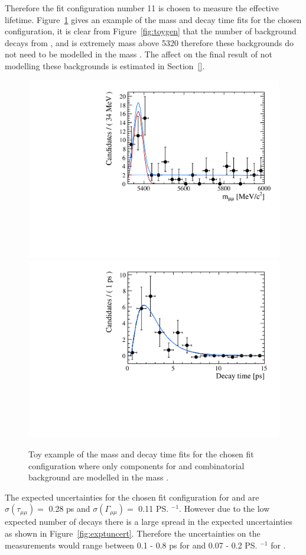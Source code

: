 {\pagebreak


Therefore the fit configuration number 11 is chosen to measure the \bsmumu effective lifetime. Figure~\ref{fig:toyegs} gives an example of the mass and decay time \ml fits for the chosen configuration, it is clear from Figure~\ref{fig:toygen} that the number of background decays from \bdmumu, \bhh and \lambdab is extremely mass above 5320 \mevcc therefore these backgrounds do not need to be modelled in the mass \pdf. The affect on the final result of not modelling these backgrounds is estimated in Section~\ref{}.

\begin{figure}[htbp]
    \centering
        \includegraphics[width= 0.49 \textwidth]{./Figs/LifetimeMeasurement/5320-6000_toy_mass.pdf}
       \includegraphics[width=0.49 \textwidth]{./Figs/LifetimeMeasurement/5320-6000_toy_lifetime.pdf}
    \caption{Toy example of the mass and decay time \ml fits for the chosen fit configuration where only components for \bsmumu and combinatorial background are modelled in the mass \pdf.}
    \label{fig:toyegs}
\end{figure}

The expected uncertainties for the chosen fit configuration for \tmumu and \Gmumu are $\sigma \left ( \tau_{\mu\mu}  \right ) = $ 0.28 ps and  $\sigma \left ( \Gamma_{\mu\mu}  \right ) = $ 0.11 \ps$^{-1}$. However due to the low expected number of decays there is a large spread in the expected uncertainties as shown in Figure~\ref{fig:exptuncert}. Therefore the uncertainties on the measurements would range between 0.1 - 0.8 ps for \tmumu and 0.07 - 0.2 \ps$^{-1}$ for \Gmumu.


}
